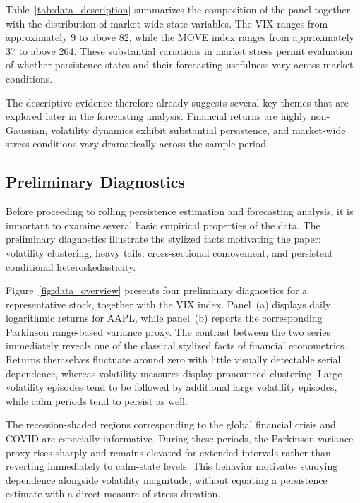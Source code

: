 \documentclass[jrfm,article,submit,moreauthors,pdftex]{Definitions/mdpi}
\begin{document}





Table~\ref{tab:data_description} summarizes the composition of the panel
together with the distribution of market-wide state variables. The VIX
ranges from approximately 9 to above 82, while the MOVE index ranges from
approximately 37 to above 264. These substantial variations in market
stress permit evaluation of whether persistence states and their
forecasting usefulness vary across market conditions.

The descriptive evidence therefore already suggests several key themes that
are explored later in the forecasting analysis. Financial returns are
highly non-Gaussian, volatility dynamics exhibit substantial persistence,
and market-wide stress conditions vary dramatically across the sample
period.



\subsection{Preliminary Diagnostics}

Before proceeding to rolling persistence estimation and forecasting
analysis, it is important to examine several basic empirical properties of
the data. The preliminary diagnostics illustrate the stylized facts motivating the
paper: volatility clustering, heavy tails, cross-sectional comovement, and
persistent conditional heteroskedasticity.

Figure~\ref{fig:data_overview} presents four preliminary diagnostics for a
representative stock, together with the VIX index. Panel~(a) displays
daily logarithmic returns for AAPL, while panel~(b) reports the
corresponding Parkinson range-based variance proxy. The contrast between
the two series immediately reveals one of the classical stylized facts of
financial econometrics. Returns themselves fluctuate around zero with
little visually detectable serial dependence, whereas volatility measures
display pronounced clustering. Large volatility episodes tend to be
followed by additional large volatility episodes, while calm periods tend
to persist as well.

The recession-shaded regions corresponding to the global financial crisis
and COVID are especially informative. During these periods, the Parkinson
variance proxy rises sharply and remains elevated for extended intervals
rather than reverting immediately to calm-state levels. This behavior
motivates studying dependence alongside volatility magnitude, without
equating a persistence estimate with a direct measure of stress duration.
\end{document}
